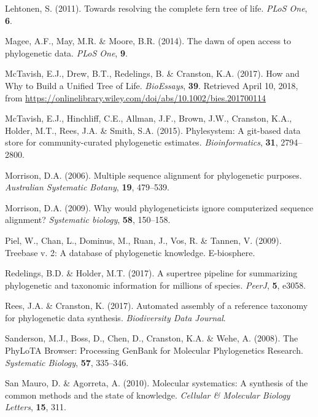 \documentclass[]{article}
\begin{document}
\leavevmode\hypertarget{ref-lehtonen2011towards}{}%
Lehtonen, S. (2011). Towards resolving the complete fern tree of life. \emph{PLoS One}, \textbf{6}.

\leavevmode\hypertarget{ref-magee2014dawn}{}%
Magee, A.F., May, M.R. \& Moore, B.R. (2014). The dawn of open access to phylogenetic data. \emph{PLoS One}, \textbf{9}.

\leavevmode\hypertarget{ref-mctavish2018bioessay}{}%
McTavish, E.J., Drew, B.T., Redelings, B. \& Cranston, K.A. (2017). How and Why to Build a Unified Tree of Life. \emph{BioEssays}, \textbf{39}. Retrieved April 10, 2018, from \url{https://onlinelibrary.wiley.com/doi/abs/10.1002/bies.201700114}

\leavevmode\hypertarget{ref-mctavish2015phylesystem}{}%
McTavish, E.J., Hinchliff, C.E., Allman, J.F., Brown, J.W., Cranston, K.A., Holder, M.T., Rees, J.A. \& Smith, S.A. (2015). Phylesystem: A git-based data store for community-curated phylogenetic estimates. \emph{Bioinformatics}, \textbf{31}, 2794--2800.

\leavevmode\hypertarget{ref-morrison2006multiple}{}%
Morrison, D.A. (2006). Multiple sequence alignment for phylogenetic purposes. \emph{Australian Systematic Botany}, \textbf{19}, 479--539.

\leavevmode\hypertarget{ref-morrison2009would}{}%
Morrison, D.A. (2009). Why would phylogeneticists ignore computerized sequence alignment? \emph{Systematic biology}, \textbf{58}, 150--158.

\leavevmode\hypertarget{ref-piel2009treebase}{}%
Piel, W., Chan, L., Dominus, M., Ruan, J., Vos, R. \& Tannen, V. (2009). Treebase v. 2: A database of phylogenetic knowledge. E-biosphere.

\leavevmode\hypertarget{ref-redelings2017supertree}{}%
Redelings, B.D. \& Holder, M.T. (2017). A supertree pipeline for summarizing phylogenetic and taxonomic information for millions of species. \emph{PeerJ}, \textbf{5}, e3058.

\leavevmode\hypertarget{ref-rees2017automated}{}%
Rees, J.A. \& Cranston, K. (2017). Automated assembly of a reference taxonomy for phylogenetic data synthesis. \emph{Biodiversity Data Journal}.

\leavevmode\hypertarget{ref-sanderson2008phylota}{}%
Sanderson, M.J., Boss, D., Chen, D., Cranston, K.A. \& Wehe, A. (2008). The PhyLoTA Browser: Processing GenBank for Molecular Phylogenetics Research. \emph{Systematic Biology}, \textbf{57}, 335--346.

\leavevmode\hypertarget{ref-san2010molecular}{}%
San Mauro, D. \& Agorreta, A. (2010). Molecular systematics: A synthesis of the common methods and the state of knowledge. \emph{Cellular \& Molecular Biology Letters}, \textbf{15}, 311.
\end{document}
